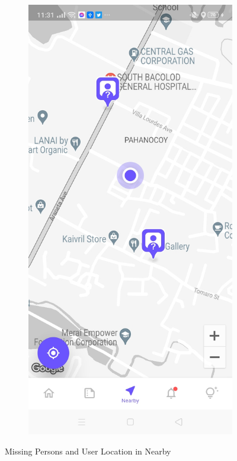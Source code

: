 \begin{figure}[!h]
\begin{subfigure}[c]{0.40\linewidth}
        \centering
        \includegraphics[scale=0.15]{figures/Chapter4/Main/Nearby-2.jpg}
    \end{subfigure}
    \caption{Missing Persons and User Location in Nearby}
    \label{fig:userTracking}
\end{figure}

